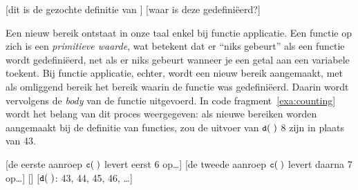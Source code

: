 \begin{NoBreak}
\codeFragmentCaption
\begin{codelines}
  \codeLine{}
  [dit is de gezochte definitie van ]
  [waar is deze  gedefiniëerd?]
\end{codelines}
\end{NoBreak}


Een nieuw bereik ontstaat in onze taal enkel bij functie applicatie. Een functie op zich is een \emph{primitieve waarde}, wat betekent dat er “niks gebeurt” als een functie wordt gedefiniëerd, net als er niks gebeurt wanneer je een getal aan een variabele toekent. Bij functie applicatie, echter, wordt een nieuw bereik aangemaakt, met als omliggend bereik het bereik waarin de functie was gedefiniëerd. Daarin wordt vervolgens de \emph{body} van de functie uitgevoerd. In code fragment~\ref{exa:counting} wordt het belang van dit proces weergegeven: als nieuwe bereiken worden aangemaakt bij de definitie van functies, zou de uitvoer van $\text{\ttfamily\small\upshape d}(\;)$ 8 zijn in plaats van 43.

\begin{NoBreak}
\codeFragmentCaption
\begin{codelines}
  \codeLine{}
  [de eerste aanroep $\text{\ttfamily\small\upshape c}(\;)$ levert eerst 6 op\dots]
  [de tweede aanroep $\text{\ttfamily\small\upshape c}(\;)$ levert daarna 7 op\dots]
  \codeLine{}[]
  [$\text{\ttfamily\small\upshape d}(\;)$: 43, 44, 45, 46, \dots]
\end{codelines}
\end{NoBreak}

